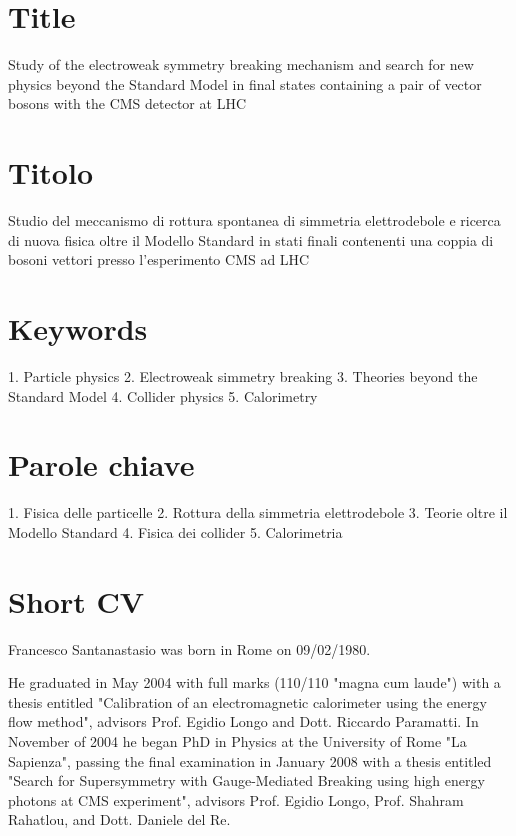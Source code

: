 \documentclass[10pt, a4paper]{article}
\begin{document}
\reversemarginpar

\section*{Title}
Study of the electroweak symmetry breaking mechanism and search 
for new physics beyond the Standard Model in final states containing a pair of 
vector bosons with the CMS detector at LHC

\section*{Titolo}
Studio del meccanismo di rottura spontanea di simmetria elettrodebole e
ricerca di nuova fisica oltre il Modello Standard in stati finali contenenti una coppia
di bosoni vettori presso l'esperimento CMS ad LHC

\section*{Keywords}
1. Particle physics
2. Electroweak simmetry breaking
3. Theories beyond the Standard Model
4. Collider physics
5. Calorimetry

\section*{Parole chiave}
1. Fisica delle particelle
2. Rottura della simmetria elettrodebole
3. Teorie oltre il Modello Standard
4. Fisica dei collider
5. Calorimetria


\section*{Short CV}

Francesco Santanastasio was born in Rome on 09/02/1980. 

He graduated in May 2004 with full marks (110/110 "magna cum laude") with a thesis entitled "Calibration of an electromagnetic calorimeter using the energy flow method", advisors Prof. Egidio Longo and Dott. Riccardo Paramatti. In November of 2004 he began PhD in Physics at the University of Rome "La Sapienza", passing the final examination in January 2008 with a thesis entitled "Search for Supersymmetry with Gauge-Mediated Breaking using high energy photons at CMS experiment", advisors Prof. Egidio Longo, Prof. Shahram Rahatlou, and Dott. Daniele del Re. 
\end{document}
